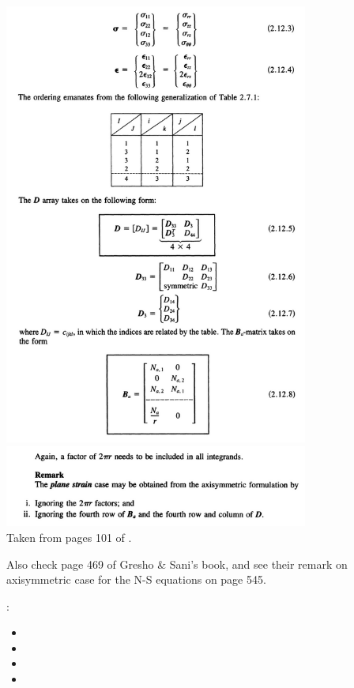 \begin{center}
\includegraphics[width=10cm]{images/axisymmetry/hughes1}
\includegraphics[width=10cm]{images/axisymmetry/hughes2}\\
{\captionfont Taken from pages 101 of .}
\end{center}


Also check page 469 of Gresho \& Sani's book, and 
see their remark on axisymmetric case for the N-S equations on page 545.

\Literature:
\begin{itemize}
\item {}
\item {}
\item {} 
\item {}
\end{itemize}




